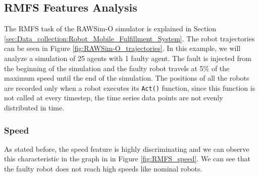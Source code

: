 \documentclass[../../Thesis.tex]{subfiles}
\begin{document}
		\subsection{RMFS Features Analysis}
			The RMFS task of the RAWSim-O simulator is explained in Section \ref{sec:Data_collection:Robot_Mobile_Fulfillment_System}. The robot trajectories can be seen in Figure \ref{fig:RAWSim-O_trajectories}. In this example, we will analyze a simulation of 25 agents with 1 faulty agent. The fault is injected from the beginning of the simulation and the faulty robot travels at 5\% of the maximum speed until the end of the simulation. The positions of all the robots are recorded only when a robot executes its \verb|Act()| function, since this function is not called at every timestep, the time series data points are not evenly distributed in time.
			\subsubsection{Speed}
				As stated before, the speed feature is highly discriminating and we can observe this characteristic in the graph in in Figure \ref{fig:RMFS_speed}.  We can see that the faulty robot does not reach high speeds like nominal robots. 
\end{document}
